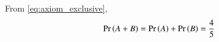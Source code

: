 From \eqref{eq:axiom_exclusive},
\begin{align}
  \Pr\left(A+B\right) = \Pr\left(A\right) + \Pr\left(B\right) 
  = \frac{4}{5}
\end{align}


